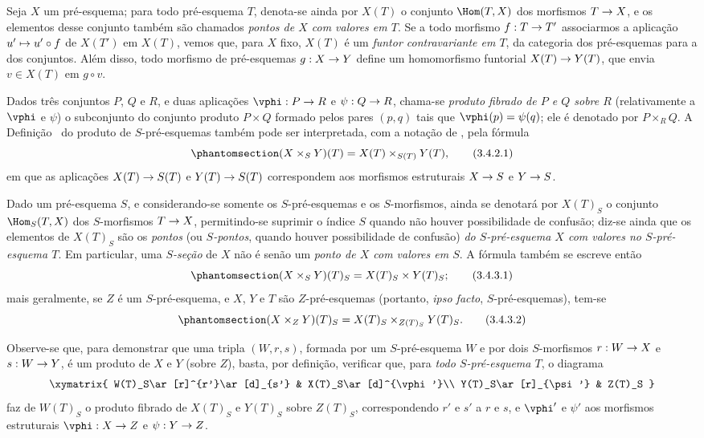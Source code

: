 \documentclass[oneside]{amsart}
\makeatletter
\newcommand{\ega@arrow}[2]{\mathchoice{#1}{#2}{#2}{#2}}
\let\ega@shortmapsto\mapsto
\renewcommand{\to}{\ega@arrow{\longrightarrow}{\rightarrow}}
\renewcommand{\mapsto}{\ega@arrow{\longmapsto}{\ega@shortmapsto}}
\newcommand{\oldpage}[2][]{{\marginnote{\normalfont\textbf{#1}~|~#2}}\ignorespaces}
\let\EGAOriginalLabel\label
\renewcommand{\label}[1]{\phantomsection\EGAOriginalLabel{#1}}
\makeatother
\begin{document}
\begin{env}[3.4.1]
\label{I.3.4.1}
Seja $X$ um pré-esquema; para todo pré-esquema $T$, denota-se ainda por
$X(T)$ o conjunto $\Hom(T,X)$ dos morfismos $T\to X$, e os elementos desse
conjunto também são chamados \emph{pontos de $X$ com valores em $T$}. Se a
todo morfismo $f:T\to T'$ associarmos a aplicação $u'\mapsto u'\circ f$ de
$X(T')$ em $X(T)$, vemos que, para $X$ fixo, $X(T)$ é um \emph{funtor
contravariante em $T$}, da categoria dos pré-esquemas para a dos conjuntos.
Além disso, todo morfismo de pré-esquemas $g:X\to Y$ define um homomorfismo
funtorial $X(T)\to Y(T)$, que envia $v\in X(T)$ em $g\circ v$.
\end{env}

\begin{env}[3.4.2]
\label{I.3.4.2}
Dados três conjuntos $P$, $Q$ e $R$, e duas aplicações $\vphi:P\to R$ e
$\psi:Q\to R$, chama-se \emph{produto fibrado de $P$ e $Q$ sobre $R$}
(relativamente a $\vphi$ e $\psi$) o subconjunto do
\oldpage[I]{112}
conjunto produto $P\times Q$ formado pelos pares $(p,q)$ tais que
$\vphi(p)=\psi(q)$; ele é denotado por $P\times_R Q$. A Definição~
 do produto de $S$-pré-esquemas também pode ser interpretada,
com a notação de , pela fórmula
\[
\label{I.3.4.2.1}
  (X\times_S Y)(T)=X(T)\times_{S(T)}Y(T),
  \tag{3.4.2.1}
\]
em que as aplicações $X(T)\to S(T)$ e $Y(T)\to S(T)$ correspondem aos
morfismos estruturais $X\to S$ e $Y\to S$.
\end{env}

\begin{env}[3.4.3]
\label{I.3.4.3}
Dado um pré-esquema $S$, e considerando-se somente os $S$-pré-esquemas e os
$S$-morfismos, ainda se denotará por $X(T)_S$ o conjunto $\Hom_S(T,X)$ dos
$S$-morfismos $T\to X$, permitindo-se suprimir o índice $S$ quando não houver
possibilidade de confusão; diz-se ainda que os elementos de $X(T)_S$ são os
\emph{pontos} (ou \emph{$S$-pontos}, quando houver possibilidade de confusão)
\emph{do $S$-pré-esquema $X$ com valores no $S$-pré-esquema $T$}. Em
particular, uma \emph{$S$-seção} de $X$ não é senão um \emph{ponto de $X$ com
valores em $S$}. A fórmula  também se escreve então
\[
\label{I.3.4.3.1}
  (X\times_S Y)(T)_S=X(T)_S\times Y(T)_S;
  \tag{3.4.3.1}
\]
mais geralmente, se $Z$ é um $S$-pré-esquema, e $X$, $Y$ e $T$ são
$Z$-pré-esquemas (portanto, \emph{ipso facto}, $S$-pré-esquemas), tem-se
\[
\label{I.3.4.3.2}
  (X\times_Z Y)(T)_S=X(T)_S\times_{Z(T)_S}Y(T)_S.
  \tag{3.4.3.2}
\]

Observe-se que, para demonstrar que uma tripla $(W,r,s)$, formada por um
$S$-pré-esquema $W$ e por dois $S$-morfismos $r:W\to X$ e $s:W\to Y$, é um
produto de $X$ e $Y$ (sobre $Z$), basta, por definição, verificar que, para
\emph{todo $S$-pré-esquema $T$}, o diagrama
\[
  \xymatrix{
    W(T)_S\ar[r]^{r'}\ar[d]_{s'} &
    X(T)_S\ar[d]^{\vphi'}\\
    Y(T)_S\ar[r]_{\psi'} &
    Z(T)_S
  }
\]
faz de $W(T)_S$ o produto fibrado de $X(T)_S$ e $Y(T)_S$ sobre $Z(T)_S$,
correspondendo $r'$ e $s'$ a $r$ e $s$, e $\vphi'$ e $\psi'$ aos morfismos
estruturais $\vphi:X\to Z$ e $\psi:Y\to Z$.
\end{env}
\end{document}
